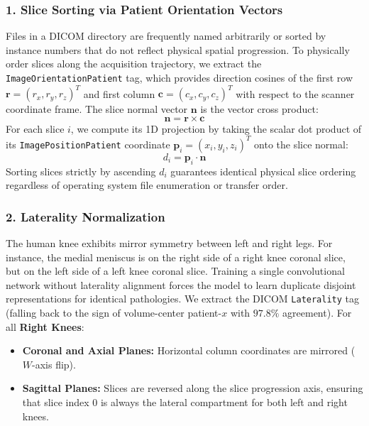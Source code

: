 \documentclass[11pt,a4paper]{article}
\begin{document}
\subsubsection{1. Slice Sorting via Patient Orientation Vectors}
Files in a DICOM directory are frequently named arbitrarily or sorted by instance numbers that do not reflect physical spatial progression. To physically order slices along the acquisition trajectory, we extract the \texttt{ImageOrientationPatient} tag, which provides direction cosines of the first row $\mathbf{r} = (r_x, r_y, r_z)^T$ and first column $\mathbf{c} = (c_x, c_y, c_z)^T$ with respect to the scanner coordinate frame. The slice normal vector $\mathbf{n}$ is the vector cross product:
\begin{equation}
    \mathbf{n} = \mathbf{r} \times \mathbf{c}
\end{equation}
For each slice $i$, we compute its 1D projection by taking the scalar dot product of its \texttt{ImagePositionPatient} coordinate $\mathbf{p}_i = (x_i, y_i, z_i)^T$ onto the slice normal:
\begin{equation}
    d_i = \mathbf{p}_i \cdot \mathbf{n}
\end{equation}
Sorting slices strictly by ascending $d_i$ guarantees identical physical slice ordering regardless of operating system file enumeration or transfer order.

\subsubsection{2. Laterality Normalization}
The human knee exhibits mirror symmetry between left and right legs. For instance, the medial meniscus is on the right side of a right knee coronal slice, but on the left side of a left knee coronal slice. Training a single convolutional network without laterality alignment forces the model to learn duplicate disjoint representations for identical pathologies. 
We extract the DICOM \texttt{Laterality} tag (falling back to the sign of volume-center patient-$x$ with $97.8\%$ agreement). For all \textbf{Right Knees}:
\begin{itemize}
    \item \textbf{Coronal and Axial Planes:} Horizontal column coordinates are mirrored ($W$-axis flip).
    \item \textbf{Sagittal Planes:} Slices are reversed along the slice progression axis, ensuring that slice index $0$ is always the lateral compartment for both left and right knees.
\end{itemize}
\end{document}
